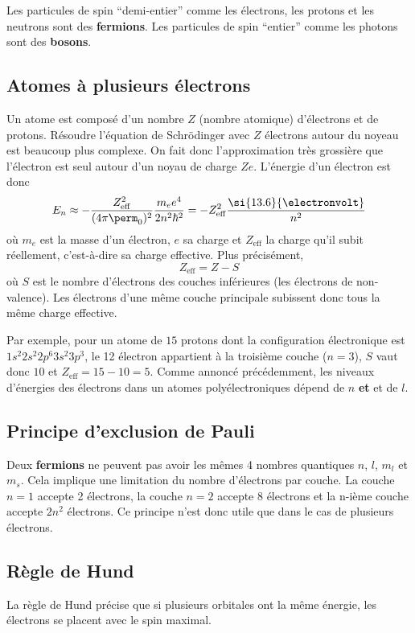 \begin{myrem}
	Les particules de spin ``demi-entier'' comme les
	électrons, les protons et les neutrons sont des \textbf{fermions}.
	Les particules de spin ``entier'' comme les photons sont
	des \textbf{bosons}.
\end{myrem}

\subsection{Atomes à plusieurs électrons}
Un atome est composé d'un nombre $Z$ (nombre atomique)
d'électrons et de protons. Résoudre l'équation de Schrödinger
avec $Z$ électrons autour du noyeau est beaucoup plus complexe.
On fait donc l'approximation très grossière que l'électron
est seul autour d'un noyau de charge $Ze$.
L'énergie d'un électron est donc
\[ E_n \approx -\frac{Z_\mathrm{eff}^2}{(4\pi\perm_0)^2}\frac{m_ee^4}{2n^2\hbar^2}
= -Z_\mathrm{eff}^2\frac{\si{13.6}{\electronvolt}}{n^2} \]
où $m_e$ est la masse d'un électron, $e$ sa charge et
$Z_\mathrm{eff}$ la charge qu'il subit réellement,
c'est-à-dire sa charge effective.
Plus précisément, 
\[ Z_\mathrm{eff} = Z - S \] 
où $S$ est le nombre d'électrons des couches inférieures (les électrons de non-valence).
Les électrons d'une même couche principale subissent donc tous la même charge effective.

Par exemple, pour un atome de $15$ protons dont la configuration 
électronique est $1s^2 2s^2 2p^6 3s^2 3p^3$, le 12\ieme{} électron
appartient à la troisième couche ($n=3$), $S$ vaut donc $10$ et 
$Z_\mathrm{eff} = 15 - 10 = 5$. Comme annoncé précédemment,
les niveaux d'énergies des électrons dans un atomes polyélectroniques
dépend de $n$ \textbf{et} et de $l$.

\subsection{Principe d'exclusion de Pauli}
Deux \textbf{fermions} ne peuvent pas avoir les mêmes 4 nombres quantiques
$n$, $l$, $m_l$ et $m_s$. Cela implique une limitation du nombre
d'électrons par couche. La couche $n=1$ accepte 2 électrons,
la couche $n=2$ accepte 8 électrons et la n-ième couche
accepte $2n^2$ électrons.
Ce principe n'est donc utile que dans le cas de plusieurs électrons.

\subsection{Règle de Hund}
La règle de Hund précise que si plusieurs
orbitales ont la même énergie, les électrons
se placent avec le spin maximal.

